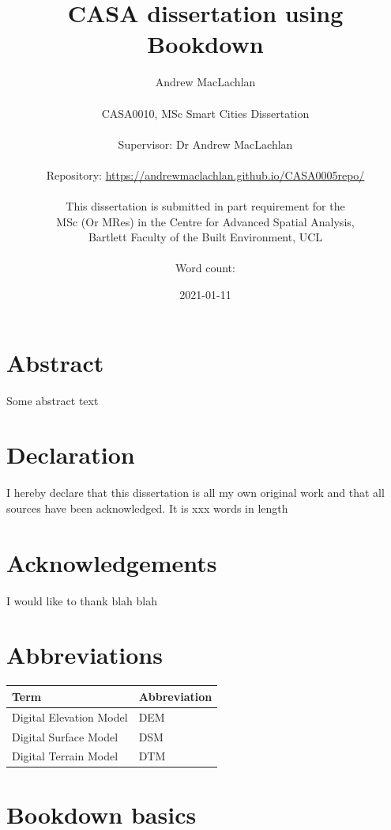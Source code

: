 \documentclass[
  12pt,
  oneside]{book}
\title{CASA dissertation using Bookdown}
\author{Andrew MacLachlan\\
~\\
CASA0010, MSc Smart Cities Dissertation\\
~\\
Supervisor: Dr Andrew MacLachlan\\
~\\
Repository: \url{https://andrewmaclachlan.github.io/CASA0005repo/}\\
~\\
This dissertation is submitted in part requirement for the\\
MSc (Or MRes) in the Centre for Advanced Spatial Analysis,\\
Bartlett Faculty of the Built Environment, UCL\\
~\\
Word count:}
\date{2021-01-11}
\begin{document}
\maketitle


\hypertarget{abstract}{%
\chapter*{Abstract}\label{abstract}}

Some abstract text

\hypertarget{declaration}{%
\chapter*{Declaration}\label{declaration}}

I hereby declare that this dissertation is all my own original work and that all sources have been acknowledged. It is xxx words in length

\hypertarget{acknowledgements}{%
\chapter*{Acknowledgements}\label{acknowledgements}}

I would like to thank blah blah

\setcounter{tocdepth}{3}
\tableofcontents
\listoffigures
\listoftables

\hypertarget{abbreviations}{%
\chapter*{Abbreviations}\label{abbreviations}}

\begin{table}[H]
\centering
\begin{tabular}{ll}
\toprule
\textbf{Term} & \textbf{Abbreviation}\\
\midrule
Digital Elevation Model & DEM\\
Digital Surface Model & DSM\\
Digital Terrain Model & DTM\\
\bottomrule
\end{tabular}
\end{table}

\hypertarget{bookdown-basics}{%
\chapter{Bookdown basics}\label{bookdown-basics}}
\end{document}

